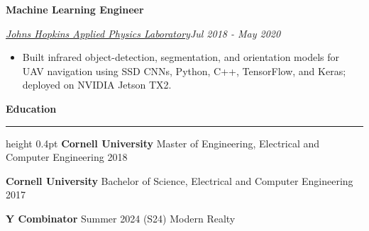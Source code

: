 \documentclass[11pt,letterpaper]{article}
\let\ResumeOriginalHref\href
\renewcommand{\href}[2]{\ResumeOriginalHref{#1}{\underline{#2}}}
\newcommand{\ResumeSection}[1]{%
  \par\addvspace{6pt}\Needspace{42pt}%
  {\fontsize{13}{15}\selectfont\bfseries #1\par}%
  \vspace{2pt}\hrule height 0.4pt\vspace{4pt}}
\newcommand{\ResumeRole}[3]{%
  \par\addvspace{3pt}\Needspace{49pt}%
  {\fontsize{11}{13}\selectfont\bfseries #1\par}%
  {\itshape #2\hfill\upshape #3\par}\nopagebreak}
\newenvironment{ResumeItems}{%
  \begin{itemize}[label={\raisebox{0.15ex}{\fontsize{7}{7}\selectfont\rmfamily\textbullet}},leftmargin=11pt,labelsep=5pt,
    topsep=1.5pt,itemsep=0.7pt,parsep=0pt,partopsep=0pt]}{\end{itemize}}
\begin{document}
\ResumeRole{Machine Learning Engineer}{\href{https://www.jhuapl.edu/}{Johns Hopkins Applied Physics Laboratory}}{Jul 2018 - May 2020}
\begin{ResumeItems}
\item Built infrared object-detection, segmentation, and orientation models for UAV navigation using SSD CNNs, Python, C++, TensorFlow, and Keras; deployed on NVIDIA Jetson TX2.
\end{ResumeItems}
\ResumeSection{Education}
\textbf{Cornell University} \textbar{} Master of Engineering, Electrical and Computer Engineering \textbar{} 2018\par
\textbf{Cornell University} \textbar{} Bachelor of Science, Electrical and Computer Engineering \textbar{} 2017\par
\textbf{Y Combinator} \textbar{} Summer 2024 (S24) \textbar{} Modern Realty\par
\end{document}
